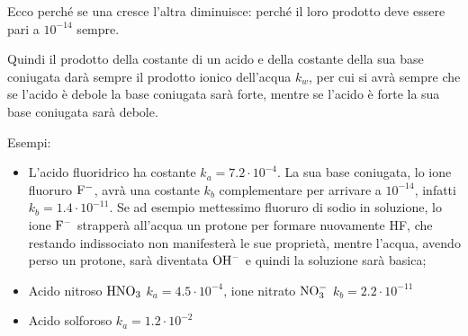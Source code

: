 Ecco perché se una cresce l'altra diminuisce: perché il loro prodotto deve essere pari a $10^{-14}$ sempre.

Quindi il prodotto della costante di un acido e della costante della sua base coniugata darà sempre il prodotto ionico dell'acqua $k_w$, per cui si avrà sempre che se l'acido è debole la base coniugata sarà forte, mentre se l'acido è forte la sua base coniugata sarà debole.

\vspace{0.2cm}Esempi:
\begin{itemize}
    \item L'acido fluoridrico ha costante $k_a=7.2 \cdot 10^{-4}$. La sua base coniugata, lo ione fluoruro $\rm F^-$, avrà una costante $k_b$ complementare per arrivare a $10^{-14}$, infatti $k_b=1.4\cdot10^{-11}$. Se ad esempio mettessimo fluoruro di sodio in soluzione, lo ione $\rm F^-$ strapperà all'acqua un protone per formare nuovamente HF, che restando indissociato non manifesterà le sue proprietà, mentre l'acqua, avendo perso un protone, sarà diventata $\rm OH^-$ e quindi la soluzione sarà basica;
    \item Acido nitroso $\rm HNO_3$ $k_a=4.5 \cdot 10^{-4}$, ione nitrato $\rm NO_3^-$ $k_b=2.2 \cdot 10^{-11}$
    \item Acido solforoso $k_a=1.2 \cdot 10^{-2}$
\end{itemize}


